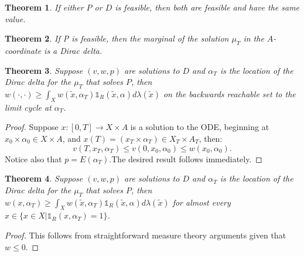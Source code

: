 \documentclass[12pt]{amsart}
\newtheorem{thm}{Theorem}
\begin{document}
\begin{thm}
If either $P$ or $D$ is feasible, then both are feasible and have the same value.
\end{thm}

\begin{thm}
If P is feasible, then the marginal of the solution $\mu_T$ in the $A$-coordinate is a Dirac delta.
\end{thm}

\begin{thm}
Suppose $(v,w,p)$ are solutions to $D$ and $\alpha_T$ is the location of the Dirac delta for the $\mu_T$ that solves $P$, then $w(\cdot, \cdot) \geq \int_{X} w(\tilde{x},\alpha_T) \mathds{1}_{R}(\tilde{x},\alpha) d\lambda(\tilde{x})$ on the backwards reachable set to the limit cycle at $\alpha_T$.
\end{thm}
\begin{proof}
Suppose $x: [0,T] \to X \times A$ is a solution to the ODE, beginning at $x_0\times \alpha_0\in X \times A$, and $x(T)  =( x_T \times \alpha_T ) \in X_T \times A_T$, then:
\begin{equation}
v(T,x_T,\alpha_T) \leq v(0,x_0,\alpha_0)  \leq w(x_0,\alpha_0).
\end{equation}
Notice also that $p = E(\alpha_T)$.The desired result follows immediately.
\end{proof}

\begin{thm}
Suppose $(v,w,p)$ are solutions to $D$ and $\alpha_T$ is the location of the Dirac delta for the $\mu_T$ that solves $P$, then $w(x,\alpha_T) \geq \int_{X} w(\tilde{x},\alpha_T) \mathds{1}_{R}(\tilde{x},\alpha) d\lambda(\tilde{x})$ for almost every $x \in \{ x \in X | \mathds{1}_R(x,\alpha_T)  = 1\}$.
\end{thm}
\begin{proof}
This follows from straightforward measure theory arguments given that $w \leq 0$.
\end{proof}
\end{document}
